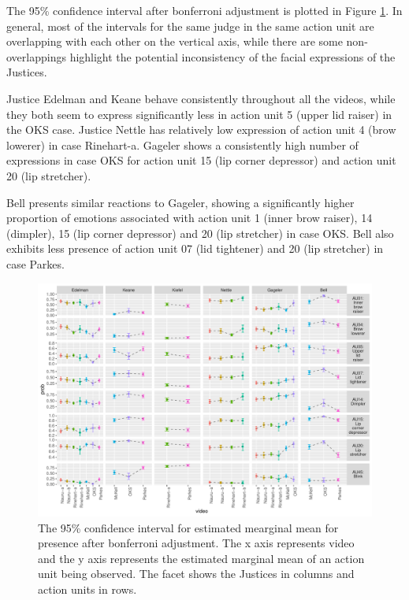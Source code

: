 \documentclass{monashthesis}
\begin{document}
The 95\% confidence interval after bonferroni adjustment is plotted in Figure \ref{fig:model2-plot}. In general, most of the intervals for the same judge in the same action unit are overlapping with each other on the vertical axis, while there are some non-overlappings highlight the potential inconsistency of the facial expressions of the Justices.

Justice Edelman and Keane behave consistently throughout all the videos, while they both seem to express significantly less in action unit 5 (upper lid raiser) in the OKS case. Justice Nettle has relatively low expression of action unit 4 (brow lowerer) in case Rinehart-a. Gageler shows a consistently high number of expressions in case OKS for action unit 15 (lip corner depressor) and action unit 20 (lip stretcher).

Bell presents similar reactions to Gageler, showing a significantly higher proportion of emotions associated with action unit 1 (inner brow raiser), 14 (dimpler), 15 (lip corner depressor) and 20 (lip stretcher) in case OKS. Bell also exhibits less presence of action unit 07 (lid tightener) and 20 (lip stretcher) in case Parkes.

\begin{figure}

{\centering \includegraphics[width=1\linewidth]{figures/model2-plot-1} 

}

\caption{The 95\% confidence interval for estimated mearginal mean for presence after bonferroni adjustment. The x axis represents video and the y axis represents the estimated marginal mean of an action unit being observed. The facet shows the Justices in columns and action units in rows. }\label{fig:model2-plot}
\end{figure}
\end{document}
